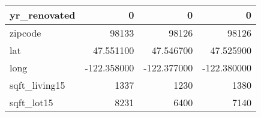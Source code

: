 \begin{table}[H]
\begin{tabular}{|l|r|r|r|}
\hline yr\_renovated & \cellcolor[rgb]{0.9, 0.54, 0.52} 0 & \cellcolor[rgb]{0.9, 0.54, 0.52} 0 & \cellcolor[rgb]{0.9, 0.54, 0.52} 0 \\
\hline zipcode & \cellcolor[rgb]{0.9, 0.54, 0.52} 98133 & 98126 & 98126 \\
\hline lat & \cellcolor[rgb]{0.9, 0.54, 0.52} 47.551100 & 47.546700 & 47.525900 \\
\hline long & \cellcolor[rgb]{0.9, 0.54, 0.52} -122.358000 & \cellcolor[rgb]{0.9, 0.54, 0.52} -122.377000 & \cellcolor[rgb]{0.9, 0.54, 0.52} -122.380000 \\
\hline sqft\_living15 & \cellcolor[rgb]{0.9, 0.54, 0.52} 1337 & 1230 & 1380 \\
\hline sqft\_lot15 & \cellcolor[rgb]{0.9, 0.54, 0.52} 8231 & 6400 & 7140 \\
\hline
\end{tabular}
\end{table}
